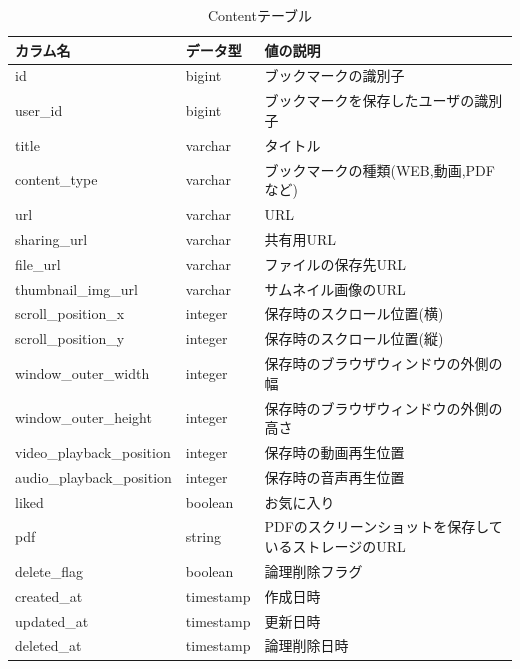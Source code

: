 \begin{table}[htbp]
  \label{tb:design-content-table}
  \caption{Contentテーブル}
  \begin{center}
    \begin{tabular}{|l|l|l|}
      \hline
      カラム名 & データ型 & 値の説明 \\\hline\hline
      id & bigint & ブックマークの識別子 \\\hline
      user\_id & bigint & ブックマークを保存したユーザの識別子 \\\hline
      title & varchar & タイトル \\\hline
      content\_type & varchar & ブックマークの種類(WEB,動画,PDFなど) \\\hline
      url & varchar & URL \\\hline
      sharing\_url & varchar & 共有用URL \\\hline
      file\_url & varchar & ファイルの保存先URL \\\hline
      thumbnail\_img\_url & varchar & サムネイル画像のURL \\\hline
      scroll\_position\_x & integer & 保存時のスクロール位置(横) \\\hline
      scroll\_position\_y & integer & 保存時のスクロール位置(縦) \\\hline
      window\_outer\_width & integer & 保存時のブラウザウィンドウの外側の幅 \\\hline
      window\_outer\_height & integer & 保存時のブラウザウィンドウの外側の高さ \\\hline
      video\_playback\_position & integer & 保存時の動画再生位置 \\\hline
      audio\_playback\_position & integer & 保存時の音声再生位置 \\\hline
      liked & boolean & お気に入り \\\hline
      pdf & string & PDFのスクリーンショットを保存しているストレージのURL \\\hline
      delete\_flag & boolean & 論理削除フラグ \\\hline
      created\_at & timestamp & 作成日時 \\\hline
      updated\_at & timestamp & 更新日時 \\\hline
      deleted\_at & timestamp & 論理削除日時 \\\hline
    \end{tabular}
  \end{center}
\end{table}

